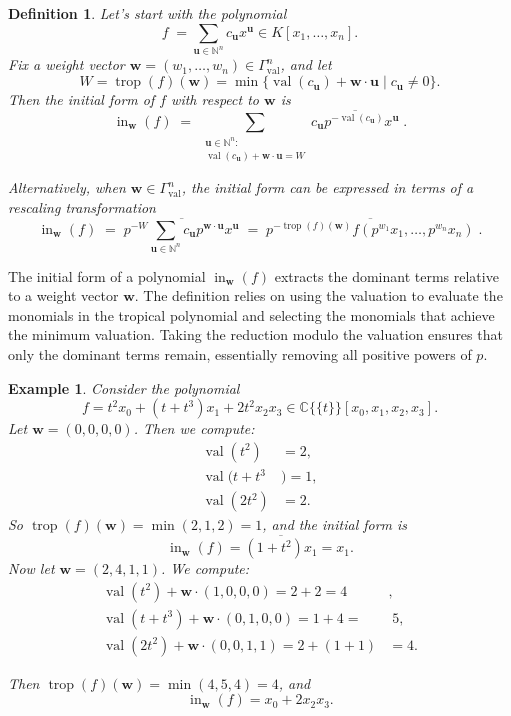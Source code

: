 \documentclass[11pt,reqno,a4paper]{article}
\theoremstyle{theoremstyle}
\theoremstyle{examplestyle}
\newtheorem{example}[theorem]{Example}
\newtheorem{definition}[theorem]{Definition}
\theoremstyle{algorithmstyle}
\numberwithin{equation}{subsection}
\newcommand{\NN}{\mathbb{N}}
\newcommand{\puiseux}{\mathbb{C}\{\{t\}\}}
\DeclareMathOperator{\trop}{trop}
\DeclareMathOperator{\val}{val}
\DeclareMathOperator{\initial}{in}
\begin{document}
\begin{definition}
    Let's start with the polynomial \[f \; = \sum_{\mathbf{u}\in\NN^n}c_\mathbf{u}x^\mathbf{u} \in K[x_1,\ldots,x_n].\] Fix a \textit{weight vector} $\mathbf{w} = (w_1,\ldots,w_n)\in\Gamma_{\val}^{n}$, and let \[W = \trop(f)(\mathbf{w}) = \min\{ \val(c_{\mathbf{u}}) + \mathbf{w} \cdot \mathbf{u} \;|\; c_{\mathbf{u}}\neq 0\}.\] Then the \textit{initial form} of $f$ with respect to $\mathbf{w}$ is
    \begin{equation*}
        \initial_{\mathbf{w}}(f) \; = \; \sum_{\substack{\mathbf{u}\in\NN^{n}: \\ \val(c_\mathbf{u}) + \mathbf{w}\cdot\mathbf{u} = W}} \overline{c_{\mathbf{u}}p^{-\val(c_\mathbf{u})}x^{\mathbf{u}}}\;.
    \end{equation*}

    Alternatively, when $\mathbf{w}\in\Gamma_{\val}^{n}$, the initial form can be expressed in terms of a rescaling transformation 
    \begin{equation*}
        \initial_{\mathbf{w}}(f) \; = \; \overline{p^{-W} \sum_{\mathbf{u}\in\NN^{n}}c_{\mathbf{u}}p^{\mathbf{w}\cdot\mathbf{u}}x^{\mathbf{u}} } \; = \; \overline{p^{-\trop(f)(\mathbf{w})}f(p^{w_1}x_1,\ldots,p^{w_n}x_n)}\;.
    \end{equation*}
\end{definition}

The initial form of a polynomial $\initial_{\mathbf{w}}(f)$ extracts the dominant terms relative to a weight vector $\mathbf{w}$. The definition relies on using the valuation to evaluate the monomials in the tropical polynomial and selecting the monomials that achieve the minimum valuation. Taking the reduction modulo the valuation ensures that only the dominant terms remain, essentially removing all positive powers of $p$.

\begin{example}
    Consider the polynomial \[f = t^2x_0 + (t+t^3)x_1 + 2t^2x_2x_3 \in \puiseux[x_0,x_1,x_2,x_3].\]
    Let $\mathbf{w} = (0,0,0,0)$. Then we compute:
    \begin{align*}
        \val(t^2) &= 2, \\
        \val(t+t^3&) = 1, \\
        \val(2t^2) &= 2.
    \end{align*}
    So $\trop(f)(\mathbf{w}) = \min(2,1,2) = 1$, and the initial form is \[\initial_{\mathbf{w}}(f) = \overline{(1 + t^2)x_1} = x_1.\]
    Now let $\mathbf{w} = (2,4,1,1)$. We compute:
    \begin{align*}
        \val(t^2) + \mathbf{w}\cdot(1,0,0,0) = 2 + 2 = 4&, \\
        \val(t+t^3) + \mathbf{w}\cdot(0,1,0,0) = 1 + 4 =& \; 5, \\
        \val(2t^2) + \mathbf{w}\cdot(0,0,1,1) = 2 + (1+1) &= 4.
    \end{align*}

    
    Then $\trop(f)(\mathbf{w}) = \min(4,5,4) = 4$, and
    \[\initial_{\mathbf{w}}(f) = x_0 + 2x_2x_3.\]
\end{example}
\end{document}
